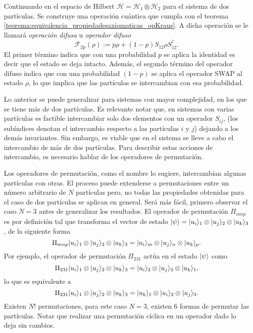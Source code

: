 Continuando en el espacio de Hilbert  $\mathcal{H}=\mathcal{H}_1\otimes\mathcal{H}_2$ para el sistema de dos partículas. Se construye una operación cuántica que cumpla con el teorema {\ref{teorema:equivalencia_propiedadesaxiomaticas_opKraus}}. A dicha operación se le  llamará \textit{operación difusa} u \textit{operador difuso}\begin{equation}\label{eq:op_F2p}
    \mathcal{F}_{2\text{p}}(\rho):=p\rho + (1-p)S_{12}\rho S_{12}^{\dagger}.
\end{equation}
El primer término indica que con una probabilidad $p$  se aplica la identidad es decir que el estado se deja intacto.  Además, el segundo término del operador difuso indica que con una probabilidad $(1-p)$ se aplica el operador SWAP al estado $\rho$, lo que implica que las partículas se intercambian con esa probabilidad.


Lo anterior se puede generalizar para sistemas con mayor complejidad, en los que se tiene más de dos partículas.  Es relevante notar que, en sistemas con varias partículas es factible intercambiar solo dos elementos con un operador $S_{ij}$, (los subíndices denotan el intercambio respecto a las partículas $i$ y $j$) dejando a los demás invariantes.  Sin embargo, es viable que en el sistema se lleve a cabo el intercambio de más de dos partículas. Para describir estas acciones de intercambio, es necesario hablar de los operadores de permutación.

Los operadores de permutación, como el nombre lo sugiere, intercambian algunas partículas con otras. El proceso puede extenderse a permutaciones entre un número arbitrario de $N$ partículas pero, no todas las propiedades obtenidas para el caso de dos partículas se aplican en general. Será más fácil, primero  observar el caso $N = 3$ antes de generalizar los resultados. El operador de permutación $\Pi_{mnp}$ es por definición tal que transforma el vector de estado $|\psi\rangle= |u_i\rangle_1\otimes |u_j\rangle_2 \otimes |u_k\rangle_3$, de la siguiente forma {\cite{cohen1977quantum}}\[\Pi_{mnp} |u_i\rangle_1\otimes |u_j\rangle_2 \otimes |u_k\rangle_3= |u_i\rangle_m\otimes |u_j\rangle_n \otimes |u_k\rangle_p.\] Por ejemplo, el operador de permutación $\Pi_{231}$ actúa en el estado $|\psi\rangle$ como  
\[\Pi_{231} |u_i\rangle_1\otimes |u_j\rangle_2 \otimes |u_k\rangle_3= |u_i\rangle_2\otimes |u_j\rangle_3 \otimes |u_k\rangle_1,\] lo que es equivalente a 
\[\Pi_{231} |u_i\rangle_1\otimes |u_j\rangle_2 \otimes |u_k\rangle_3= |u_k\rangle_1\otimes|u_i\rangle_2\otimes  |u_j\rangle_3.\]  Existen $N$! permutaciones, para este caso $N = 3$, existen 6 formas de permutar las partículas. Notar que realizar una permutación cíclica en un operador dado lo deja sin cambios. 



